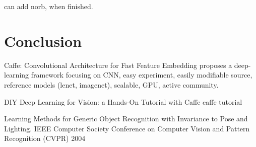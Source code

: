 \documentclass[a4paper,12pt]{report}
\begin{document}
can add norb, when finished.


\chapter{Conclusion}

{}


Caffe: Convolutional Architecture for Fast Feature Embedding
proposes a deep-learning framework focusing on CNN, easy experiment, easily modifiable source, reference models (lenet, imagenet), scalable, GPU, active community.

DIY Deep Learning for Vision: a Hands-On Tutorial with Caffe
caffe tutorial

Learning Methods for Generic Object Recognition with Invariance to Pose and Lighting. IEEE Computer Society Conference on Computer Vision and Pattern Recognition (CVPR) 2004
\end{document}
